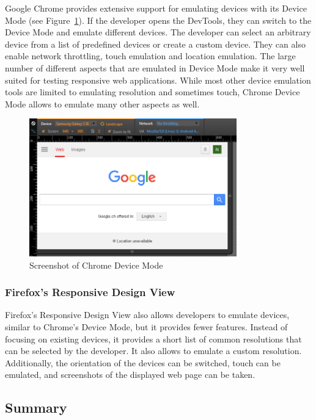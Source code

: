 Google Chrome provides extensive support for emulating devices with its Device Mode (see Figure~\ref{fig:device_mode}). If the developer opens the DevTools, they can switch to the Device Mode and emulate different devices. The developer can select an arbitrary device from a list of predefined devices or create a custom device. They can also enable network throttling, touch emulation and location emulation. The large number of different aspects that are emulated in Device Mode make it very well suited  for testing responsive web applications. While most other device emulation tools are limited to emulating resolution and sometimes touch, Chrome Device Mode allows to emulate many other aspects as well.

\begin{figure}[H]
  \centering
    \includegraphics[width=0.8\textwidth]{images/relatedwork/device_mode_2.png}
	\caption[Screenshot: Chrome Device Mode]{Screenshot of Chrome Device Mode}
	\label{fig:device_mode}
\end{figure}

\subsubsection{Firefox's Responsive Design View}

Firefox's Responsive Design View also allows developers to emulate devices, similar to Chrome's Device Mode, but it provides fewer features. Instead of focusing on existing devices, it provides a short list of common resolutions that can be selected by the developer. It also allows to emulate a custom resolution. Additionally, the orientation of the devices can be switched, touch can be emulated, and screenshots of the displayed web page can be taken.

\subsection{Summary}

